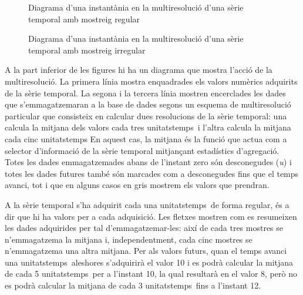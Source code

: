 \begin{figure}[tp]
  \centering
  
  \caption{Diagrama d'una instantània en la multiresolució d'una sèrie temporal amb mostreig regular}
  \label{fig:model:multiresolucio-motivacio}
\end{figure}


\begin{figure}[tp]
  \centering
  
  \caption{Diagrama d'una instantània en la multiresolució d'una sèrie temporal amb mostreig irregular}
  \label{fig:model:multiresolucio-motivacio-irregular}
\end{figure}




A la part inferior de les figures hi ha un diagrama que mostra l'acció
de la multiresolució.  La primera línia mostra enquadrades els valors
numèrics adquirits de la sèrie temporal. La segona i la tercera línia
mostren encerclades les dades que s'emmagatzemaran a la base de dades
segons un esquema de multiresolució particular que consisteix en
calcular dues resolucions de la sèrie temporal: una calcula la mitjana
dels valors cada tres \gls{unitatstemps}\ i l'altra calcula la mitjana
cada cinc \gls{unitatstemps} En aquest cas, la mitjana és la funció
que actua com a selector d'informació de la sèrie temporal mitjançant
estadístics d'agregació.  Totes les dades emmagatzemades abans de
l'instant zero són desconegudes (\emph{u}) i totes les dades futures
també són marcades com a desconegudes fins que el temps avanci, tot i
que en alguns casos en gris mostrem els valors que prendran.


A  la sèrie temporal s'ha
adquirit cada una \gls{unitatstemps}\ de forma regular, és a dir que
hi ha valors per a cada adquisició. Les fletxes mostren com es
resumeixen les dades adquirides per tal d'emmagatzemar-les: així de
cada tres mostres se n'emmagatzema la mitjana i, independentment, cada
cinc mostres se n'emmagatzema una altra mitjana.  Per als valors
futurs, quan el temps avanci una \gls{unitatstemps}\ aleshores
s'adquirirà el valor 10 i es podrà calcular la mitjana de cada 5
\gls{unitatstemps}\ per a l'instant 10, la qual resultarà en el valor
8, però no es podrà calcular la mitjana de cada 3 \gls{unitatstemps}\
fins a l'instant 12.



